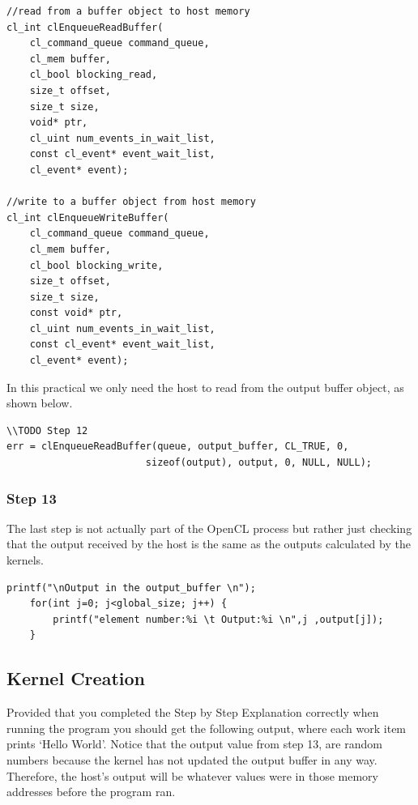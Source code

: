 \begin{lstlisting}
//read from a buffer object to host memory
cl_int clEnqueueReadBuffer(
    cl_command_queue command_queue,
    cl_mem buffer,
    cl_bool blocking_read,
    size_t offset,
    size_t size,
    void* ptr,
    cl_uint num_events_in_wait_list,
    const cl_event* event_wait_list,
    cl_event* event);
    
//write to a buffer object from host memory
cl_int clEnqueueWriteBuffer(
    cl_command_queue command_queue,
    cl_mem buffer,
    cl_bool blocking_write,
    size_t offset,
    size_t size,
    const void* ptr,
    cl_uint num_events_in_wait_list,
    const cl_event* event_wait_list,
    cl_event* event);
\end{lstlisting}

In this practical we only need the host to read from the output buffer object, as shown below.

\begin{lstlisting}
\\TODO Step 12
err = clEnqueueReadBuffer(queue, output_buffer, CL_TRUE, 0, 
                        sizeof(output), output, 0, NULL, NULL);
\end{lstlisting}


\subsubsection{Step 13}
The last step is not actually part of the OpenCL process but rather just checking that the output received by the host is the same as the outputs calculated by the kernels.

\begin{lstlisting}
printf("\nOutput in the output_buffer \n");
	for(int j=0; j<global_size; j++) {
		printf("element number:%i \t Output:%i \n",j ,output[j]);
	}
\end{lstlisting}

\subsection{Kernel Creation}
Provided that you completed the Step by Step Explanation correctly when running the program you should get the following output, where each work item prints `Hello World'. Notice that the output value from step 13, are random numbers because the kernel has not updated the output buffer in any way. Therefore, the host's output will be whatever values were in those memory addresses before the program ran. 

